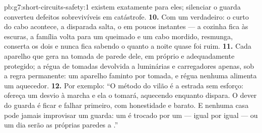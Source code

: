 \begin{solution}{pb:g7:short-circuits-safety:1}
existem exatamente para eles; silenciar o guarda converteu defeitos
sobrevivíveis em catástrofe.
\textbf{10.} Com um  verdadeiro: o curto do cabo acontece, a
disparada salta, o   em poucos instantes --- a cozinha
fica às escuras, a família volta para um  queimado e um cabo
mordido, resmunga, conserta os dois e nunca fica sabendo o quanto a
noite quase foi ruim.
\textbf{11.} Cada aparelho que gera  na tomada de parede dele,
em  próprio e adequadamente protegido; a régua de tomadas
devolvida a luminárias e carregadores apenas, sob a regra permanente:
um aparelho faminto por tomada, e régua nenhuma alimenta um
aquecedor.
\textbf{12.} Por exemplo: ``O método do vilão é a estrada sem
esforço: ofereça um desvio à marcha e ela o tomará, aquecendo
enquanto dispara. O dever do guarda é ficar  e falhar
primeiro, com honestidade e barato. E nenhuma casa pode jamais
improvisar um guarda: um  é trocado por um  --- igual
por igual --- ou um dia serão as próprias paredes a .''
\end{solution}
